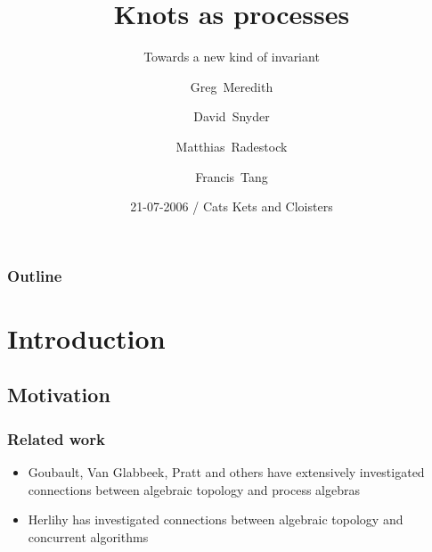 \documentclass{beamer}
\title[Knots as processes] %
{Knots as processes}
\subtitle
{Towards a new kind of invariant} %
\author[Meredith, Snyder, Radestock, Tang] %
{Greg~Meredith\inst{1} \and David~Snyder\inst{2} \and Matthias~Radestock\inst{3} \and Francis~Tang\inst{3}}
\institute[Pi to Knots Research Group] %
{
  \inst{1}%
  Biosimilarity LLC
  \and
  \inst{2}%
  Department of Mathematics\\
  Texas State University San Marcos
  \and
  \inst{3}%
  LShift Ltd}
\date[CKC 2006] %
{21-07-2006 / Cats Kets and Cloisters}
\begin{document}
\begin{frame}
  \titlepage
\end{frame}

\begin{frame}
  \frametitle{Outline}
  \tableofcontents
\end{frame}




\section{Introduction}

\subsection[Motivation]{Motivation}

\begin{frame}
  \frametitle{Related work}

  \begin{itemize}
  \item Goubault, Van Glabbeek, Pratt and others have extensively
    investigated connections between algebraic topology and process
    algebras
  \item Herlihy has investigated connections between algebraic
    topology and concurrent algorithms
  \end{itemize}
\end{frame}
\end{document}

